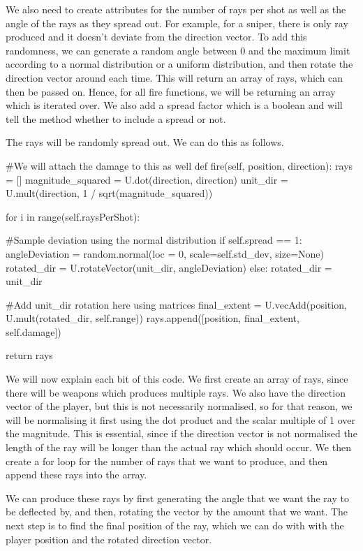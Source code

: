 We also need to create attributes for the number of rays per shot as well as the angle of the rays as they spread out. For example, for a sniper, there is only ray produced and it doesn't deviate from the direction vector. To add this randomness, we can generate a random angle between 0 and the maximum limit according to a normal distribution or a uniform distribution, and then rotate the direction vector around each time. This will return an array of rays, which can then be passed on. Hence, for all fire functions, we will be returning an array which is iterated over. We also add a spread factor which is a boolean and will tell the  method whether to include a spread or not.
\vs


The rays will be randomly spread out. We can do this as follows.
\begin{mpy}
    #We will attach the damage to this as well
    def fire(self, position, direction):
        rays = []
        magnitude_squared = U.dot(direction, direction)
        unit_dir = U.mult(direction, 1 / sqrt(magnitude_squared))

        for i in range(self.raysPerShot):

            #Sample deviation using the normal distribution
            if self.spread == 1:
                angleDeviation = random.normal(loc = 0, scale=self.std_dev, size=None)
                rotated_dir = U.rotateVector(unit_dir, angleDeviation)
            else: 
                rotated_dir = unit_dir

            #Add unit_dir rotation here using matrices
            final_extent = U.vecAdd(position, U.mult(rotated_dir, self.range))
            rays.append([position, final_extent, self.damage])

        return rays
\end{mpy}
\vs
We will now explain each bit of this code. We first create an array of rays, since there will be weapons which produces multiple rays. We also have the direction vector of the player, but this is not necessarily normalised, so for that reason, we will be normalising it first using the dot product and the scalar multiple of 1 over the magnitude. This is essential, since if the direction vector is not normalised the length of the ray will be longer than the actual ray which should occur. We then create a for loop for the number of rays that we want to produce, and then append these rays into the array.

\vs
We can produce these rays by first generating the angle that we want the ray to be deflected by, and then, rotating the vector by the amount that we want. The next step is to find the final position of the ray, which we can do with  with the player position and the rotated direction vector.

